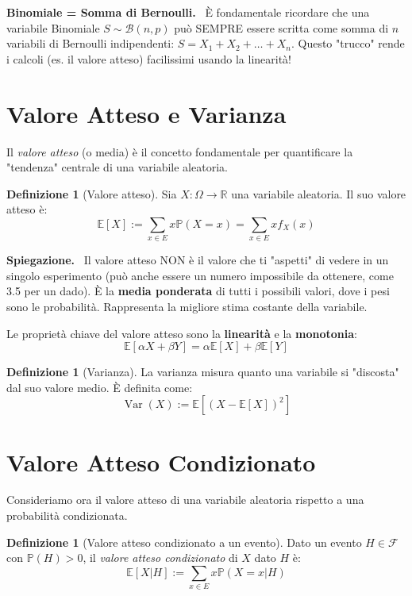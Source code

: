 \documentclass[11pt, a4paper]{report}
\theoremstyle{plain}
\theoremstyle{definition}
\newtheorem{definition}[theorem]{Definizione}
\theoremstyle{remark}
\newenvironment{hint}[1][Hint]
{\begin{mdframed}[backgroundcolor=blue!5, linecolor=blue!50, linewidth=2pt, topline=false, rightline=false, bottomline=false]
\textbf{\textsf{#1.}}\ }
{\end{mdframed}}
\newenvironment{spiegazione}[1][Spiegazione]
{\begin{mdframed}[backgroundcolor=green!5, linecolor=green!50, linewidth=2pt, topline=false, rightline=false, bottomline=false]
\textbf{\textsf{#1.}}\ }
{\end{mdframed}}
\newcommand{\PP}{\mathbb{P}}
\newcommand{\E}{\mathbb{E}}
\newcommand{\F}{\mathcal{F}}
\newcommand{\R}{\mathbb{R}}
\newcommand{\1}{\mathbf{1}}
\begin{document}
\begin{hint}[Binomiale = Somma di Bernoulli]
    È fondamentale ricordare che una variabile Binomiale $S \sim \mathcal{B}(n,p)$ può SEMPRE essere scritta come somma di $n$ variabili di Bernoulli indipendenti: $S = X_1 + X_2 + \dots + X_n$. Questo "trucco" rende i calcoli (es. il valore atteso) facilissimi usando la linearità!
\end{hint}

\section{Valore Atteso e Varianza}

Il \emph{valore atteso} (o media) è il concetto fondamentale per quantificare la "tendenza" centrale di una variabile aleatoria.

\begin{definition}[Valore atteso]
Sia $X : \Omega \to \R$ una variabile aleatoria. Il suo valore atteso è:
\[ \E[X] := \sum_{x \in E} x \PP(X = x) = \sum_{x \in E} x f_X(x) \]
\end{definition}

\begin{spiegazione}
    Il valore atteso NON è il valore che ti "aspetti" di vedere in un singolo esperimento (può anche essere un numero impossibile da ottenere, come 3.5 per un dado). È la \textbf{media ponderata} di tutti i possibili valori, dove i pesi sono le probabilità. Rappresenta la migliore stima costante della variabile.
\end{spiegazione}

Le proprietà chiave del valore atteso sono la \textbf{linearità} e la \textbf{monotonia}:
\[ \E[\alpha X + \beta Y] = \alpha \E[X] + \beta \E[Y] \]

\begin{definition}[Varianza]
La varianza misura quanto una variabile si "discosta" dal suo valore medio. È definita come:
\[ \operatorname{Var}(X) := \E[(X - \E[X])^2] \]
\end{definition}

\section{Valore Atteso Condizionato}

Consideriamo ora il valore atteso di una variabile aleatoria rispetto a una probabilità condizionata.

\begin{definition}[Valore atteso condizionato a un evento]
Dato un evento $H \in \F$ con $\PP(H) > 0$, il \emph{valore atteso condizionato} di $X$ dato $H$ è:
\[ \E[X|H] := \sum_{x \in E} x \PP(X = x | H) \]
\end{definition}
\end{document}

